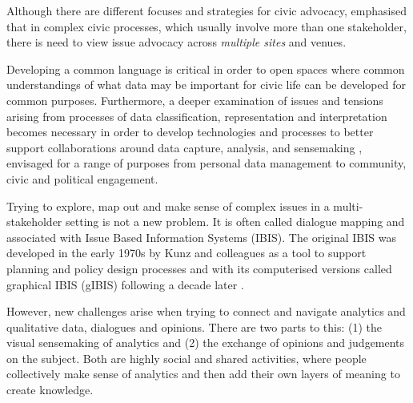 Although there are different focuses and strategies for civic advocacy, \citet{asad_tap_2017} emphasised that in complex civic processes, which usually involve more than one stakeholder, there is need to view issue advocacy across \textit{multiple sites} and venues. 


Developing a common language is critical in order to open spaces where common understandings of what data may be important for civic life can be developed for common purposes. Furthermore, a deeper examination of issues and tensions arising from processes of data classification, representation and interpretation becomes necessary in order to develop technologies and processes to better support collaborations around data capture, analysis, and sensemaking\citep{furnas_making_2005} , envisaged for a range of purposes from personal data management to community, civic and political engagement.

Trying to explore, map out and make sense of complex issues in a multi-stakeholder setting is not a new problem. It is often called dialogue mapping and associated with Issue Based Information Systems (IBIS). The original IBIS was developed in the early 1970s by Kunz and colleagues as a tool to support planning and policy design processes \citep{kunz_issues_1970} and with its computerised versions called graphical IBIS (gIBIS) following a decade later \citep{conklin_gibis:_1989,conklin_gibis:_1988}. 

However, new challenges arise when trying to connect and navigate analytics and qualitative data, dialogues and opinions. There are two parts to this: (1) the visual sensemaking of analytics and (2) the exchange of opinions and judgements on the subject. Both are highly social and shared activities, where people collectively make sense of \citep{furnas_making_2005} analytics and then add their own layers of meaning to create knowledge.


